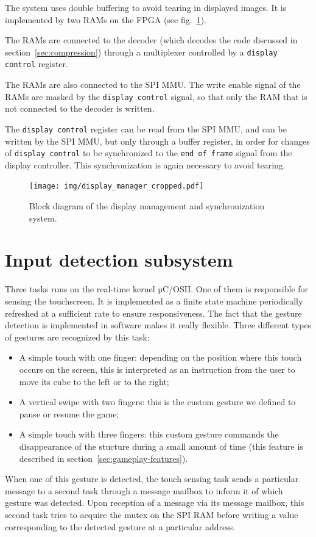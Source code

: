 \documentclass[english, DIV=13]{scrartcl}
\begin{document}
The system uses double buffering to avoid tearing in displayed images.
It is implemented by two RAMs on the FPGA (see fig.~\ref{fig:display-manager}).

The RAMs are connected to the decoder
(which decodes the code discussed in section~\ref{sec:compression})
through a multiplexer controlled by a \texttt{display control} register.

The RAMs are also connected to the SPI MMU. The write enable
signal of the RAMs are masked by the \texttt{display control} signal,
so that only the RAM that is not connected to the decoder is written.

The \texttt{display control} register can be read from the SPI MMU,
and can be written by the SPI MMU, but only through a buffer register,
in order for changes of \texttt{display control} to be synchronized
to the \texttt{end of frame} signal from the display controller.
This synchronization is again necessary to avoid tearing.

\begin{figure}
    \centering
    \texttt{[image: img/display\_manager\_cropped.pdf]}
    \caption{Block diagram of the display management and synchronization system.}
    \label{fig:display-manager}
\end{figure}

\section{Input detection subsystem}
\label{sec:input-det}

Three tasks runs on the real-time kernel µC/OSII. One of them is responsible
for sensing the touchscreen. It is implemented as a finite state machine periodically
refreshed at a sufficient rate to ensure responsiveness. The fact that the gesture
detection is implemented in software makes it really flexible. Three different types of
gestures are recognized by this task:
\begin{itemize}
    \item A simple touch with one finger: depending on the position where this touch
    occurs on the screen, this is interpreted as an instruction from the user to move
    its cube to the left or to the right;
    \item A vertical swipe with two fingers: this is the custom gesture we defined to
    pause or resume the game;
    \item A simple touch with three fingers: this custom gesture commands the
    disappearance of the stucture during a small amount of time (this feature is
    described in section~\ref{sec:gameplay-features}).
\end{itemize}
When one of this gesture is detected, the touch sensing task sends a particular
message to a second task through a message mailbox to inform it of which gesture
was detected. Upon reception of a message via its message mailbox, this second task
tries to acquire the mutex on the SPI RAM before writing a value corresponding
to the detected gesture at a particular address.
\end{document}
